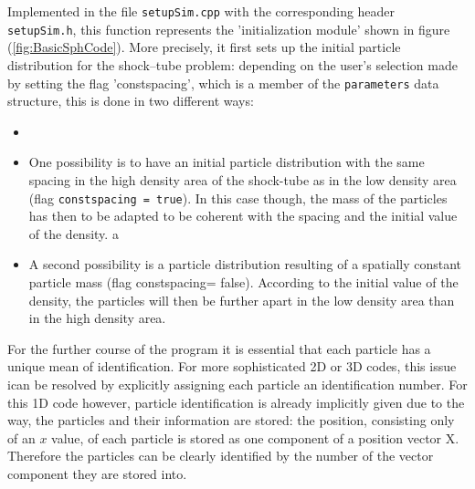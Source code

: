 \documentclass{report}
\begin{document}
Implemented in the file {\tt setupSim.cpp} with the corresponding header {\tt setupSim.h}, this function represents the 'initialization module' shown in figure (\ref{fig:BasicSphCode}). More precisely, it first sets up the initial particle distribution for the shock--tube problem: depending on the user's selection made by setting the flag 'constspacing', which is a member of the {\tt parameters} data structure, this is done in two different ways:
\begin{itemize}
 \item 


 \item One possibility is to have an initial particle distribution with the same spacing in the high density area of the shock-tube as in the low density area (flag {\tt constspacing = true}). In this case though, the mass of the particles has then to be adapted to be coherent with the spacing and the initial value of the density.
 a\item A second possibility is a particle distribution resulting of a spatially constant particle mass (flag constspacing= false). According to the initial value of the density, the particles will then be further apart in the low density area than in the high density area.
\end{itemize}
For the further course of the program it is essential that each particle has a unique mean of identification. For more sophisticated 2D or 3D codes, this issue ican be resolved by explicitly assigning each particle an identification number. For this 1D code however, particle identification is already implicitly given due to the way, the particles and their information are stored: the position, consisting only of an $x$ value, of each particle is stored as one component of a position vector X. Therefore the particles can be clearly identified by the number of the vector component they are stored into.
\end{document}
